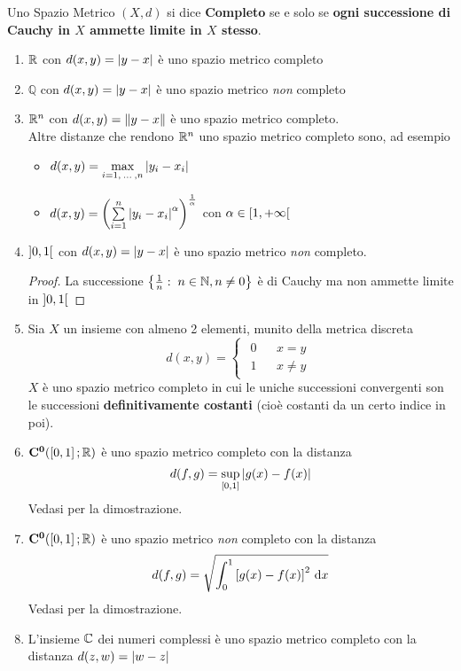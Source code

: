 \begin{definition}
	\label{def:completo}
	Uno Spazio Metrico $(X,d)$ si dice \textbf{Completo} se e solo se \textbf{ogni successione di Cauchy in $X$ ammette limite in $X$ stesso}.
\end{definition}
\begin{example}\leavevmode\vspace*{-\baselineskip}
	\begin{enumerate}
		\item $\mathbb{R}$ con $d(x,y) = \left|y - x\right|$ è uno spazio metrico completo
		\item $\mathbb{Q}$ con $d(x,y) = \left|y - x\right|$ è uno spazio metrico \textit{non} completo
		\item $\mathbb{R}^n$ con $d(x,y) = \left\|y - x\right\|$ è uno spazio metrico completo.\\
			Altre distanze che rendono $\mathbb{R}^n$ uno spazio metrico completo sono, ad esempio
			\begin{itemize}
				\item $d(x,y) = \max\limits_{i=1,\:\dotsc\:,n} \left|y_i - x_i\right|$
				\item $d(x,y) = \left( \sum\limits_{i=1}^{n} \left|y_i - x_i\right|^\alpha \right)^{\frac{1}{\alpha}}$ con $\alpha \in \left[1,+\infty\right[$
			\end{itemize}
		\item $\left]0,1\right[$ con $d(x,y) = \left|y - x\right|$ è uno spazio metrico \textit{non} completo.
			\begin{proof}
				La successione $\left\{\frac{1}{n}:\; n \in \mathbb{N}, n \neq 0\right\}$ è di Cauchy ma non ammette limite in $\left]0,1\right[$
			\end{proof}
		\item Sia $X$ un insieme con almeno 2 elementi, munito della metrica discreta
			\[d(x,y)=
			\begin{cases}
				\begin{matrix}
					0&&x=y\\
					1&&x \ne y
				\end{matrix}
			\end{cases}\]
			$X$ è uno spazio metrico completo in cui le uniche successioni convergenti son le successioni \textbf{definitivamente costanti} (cioè costanti da un certo indice in poi).
		\item $\mathbf{C^{0}}(\left[0,1\right]; \mathbb{R})$ è uno spazio metrico completo con la distanza
			\[d(f,g) = \sup\limits_{\left[0,1\right]}\left|g(x) - f(x)\right|\]
			Vedasi  per la dimostrazione.
		\item $\mathbf{C^{0}}(\left[0,1\right]; \mathbb{R})$ è uno spazio metrico \textit{non} completo con la distanza
			\[d(f,g) = \sqrt{\int_0^1 \left[ g(x) - f(x) \right]^2 \,\mathrm{d}{x}}\]
			Vedasi  per la dimostrazione.
		\item L'insieme $\mathbb{C}$ dei numeri complessi è uno spazio metrico completo con la distanza $d(z,w) = \left|w-z\right|$
	\end{enumerate}
\end{example}
